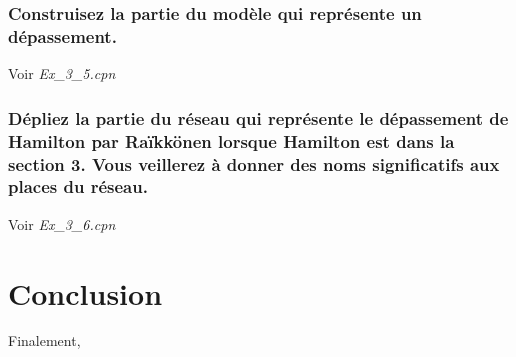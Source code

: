 \documentclass[french]{article}
\begin{document}
\subsubsection{Construisez la partie du modèle qui
  représente un dépassement.}
Voir \textit{Ex\_3\_5.cpn} \\
\subsubsection{Dépliez la partie du réseau qui représente le dépassement de Hamilton par Raïkkönen lorsque Hamilton est dans
  la section 3. Vous veillerez à donner des noms significatifs aux places du réseau.}
Voir \textit{Ex\_3\_6.cpn} \\
\section{Conclusion}
Finalement,
\end{document}
